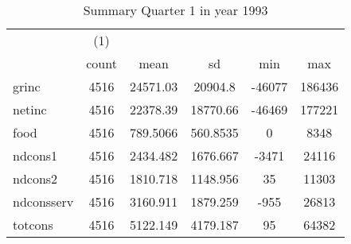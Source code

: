 \begin{table}[htbp]\centering
\def\sym#1{\ifmmode^{#1}\else\(^{#1}\)\fi}
\caption{Summary Quarter 1 in year 1993 \label{sum\_Q1\_y1993}}
\begin{tabular}{l*{1}{ccccc}}
\hline\hline
            &\multicolumn{1}{c}{(1)}&            &            &            &            \\
            &       count&        mean&          sd&         min&         max\\
\hline
grinc       &        4516&    24571.03&     20904.8&      -46077&      186436\\
netinc      &        4516&    22378.39&    18770.66&      -46469&      177221\\
food        &        4516&    789.5066&    560.8535&           0&        8348\\
ndcons1     &        4516&    2434.482&    1676.667&       -3471&       24116\\
ndcons2     &        4516&    1810.718&    1148.956&          35&       11303\\
ndconsserv  &        4516&    3160.911&    1879.259&        -955&       26813\\
totcons     &        4516&    5122.149&    4179.187&          95&       64382\\
\hline\hline
\end{tabular}
\end{table}
